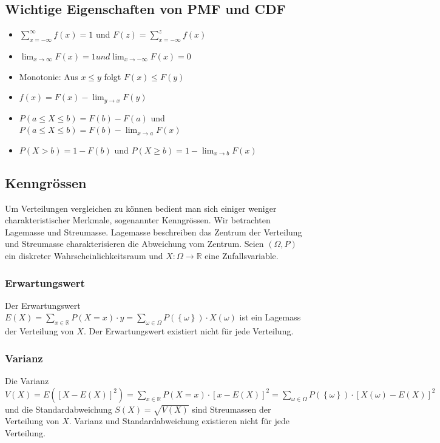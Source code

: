 \subsection{Wichtige Eigenschaften von PMF und CDF}
\label{sec:wichtige-eigenschaften-von-pmf-und-cdf}
\begin{itemize}
    \item $\sum_{x=-\infty}^{\infty} f(x) = 1$ und $F(z)=\sum_{x=-\infty}^{z} f(x)$
    \item $\lim_{x \rightarrow \infty} F(x) = 1 und \lim_{x \rightarrow -\infty} F(x) = 0$
    \item Monotonie: Aus $x \leq y$ folgt $F(x) \leq F(y)$
    \item $f(x) = F(x) - \lim_{y \rightarrow x} F(y)$
    \item $P(a \leq X \leq b) = F(b) - F(a)$ und $P(a \leq X \leq b) = F(b) - \lim_{x \rightarrow a} F(x)$
    \item $P(X > b) = 1 - F(b)$ und $P(X \geq b) = 1 - \lim_{x \rightarrow b} F(x)$
\end{itemize}
\subsection{Kenngrössen}
\label{sec:kenngrssen}
Um Verteilungen vergleichen zu können bedient man sich einiger weniger charakteristischer Merkmale, sogenannter Kenngrössen. 
Wir betrachten Lagemasse und Streumasse. Lagemasse beschreiben das Zentrum der Verteilung und Streumasse charakterisieren die Abweichung vom Zentrum.
Seien $(\Omega, P)$ ein diskreter Wahrscheinlichkeitsraum und $X: \Omega \rightarrow \mathbb{R}$ eine Zufallsvariable.
\subsubsection{Erwartungswert}
\label{sec:erwartungswert}
Der Erwartungswert $E(X) = \textstyle \sum_{x \in \mathbb{R}} P(X=x) \cdot y = \sum_{\omega \in \Omega} P(\left\{\omega\right\}) \cdot X(\omega)$ ist ein Lagemass der Verteilung von $X$.
Der Erwartungswert existiert nicht für jede Verteilung.
\subsubsection{Varianz}
\label{sec:varianz}
Die Varianz $V(X) = E(\left[X - E(X)\right]^2) = \sum_{x \in \mathbb{R}} P(X=x) \cdot \left[x - E(X)\right]^2
= \sum_{\omega \in \Omega} P(\left\{\omega\right\}) \cdot \left[X(\omega) - E(X)\right]^2$ und die Standardabweichung
$S(X) = \sqrt{V(X)}$ sind Streumassen der Verteilung von $X$. Varianz und Standardabweichung existieren nicht für jede Verteilung.
